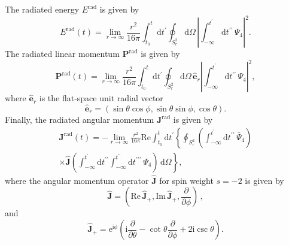 \documentclass[floats,floatfix,showpacs,amssymb,prd,twocolumn,superscriptaddress,nofootinbib,nolongbibliography,reprint]{revtex4-2}
\newcommand{\rad}{\mathrm{rad}}
\newcommand{\rmd}{\mathrm{d}}
\begin{document}
The radiated energy $E^{\rad}$ is given by
\cite{Campanelli:1998jv,Lousto:2007mh}
\begin{equation}
    E^{\rad}(t) = \lim_{r\to\infty}\frac{r^2}{16\pi}\int_{t_0}^t\rmd t^\prime
    \oint_{S^2_r}\rmd\Omega\,\left|\int_{-\infty}^{t^\prime}\rmd t^{\prime\prime}\,
    \Psi_4\right|^2.\label{eq:Erad}
\end{equation}
The radiated linear momentum $\mathbf{P}^{\rad}$ is given by
\begin{equation}
    \mathbf{P}^{\rad}(t) = \lim_{r\to\infty}\frac{r^2}{16\pi}
    \int_{t_0}^t\rmd t^\prime\oint_{S^2_r}\rmd\Omega\,
    \hat{\mathbf{e}}_r\left|\int_{-\infty}^{t^\prime}\rmd t^{\prime\prime}\,
    \Psi_4\right|^2,\label{eq:Prad}
\end{equation}
where $\hat{\mathbf{e}}_r$ is the flat-space unit radial vector
\begin{equation}
    \hat{\mathbf{e}}_r = (\sin\theta\cos\phi,\sin\theta\sin\phi,\cos\theta).
\end{equation}
Finally, the radiated angular momentum $\mathbf{J}^{\rad}$ is given by
\begin{multline}
    \mathbf{J}^{\rad}(t) = - 
    \lim_{r\to\infty}\frac{r^2}{16\pi}\mathrm{Re}\int_{t_0}^{t}\rmd t^\prime
    \left\{\oint_{S^2_r}\left(\int_{-\infty}^{t^\prime}\rmd t^{\prime\prime}\,
    \bar{\Psi}_4\right)\right.\\
    \left. \times\hat{\mathbf{J}}\left(\int_{-\infty}^{t^\prime}
    \rmd t^{\prime\prime}\int_{-\infty}^{t^{\prime\prime}}
    \rmd t^{\prime\prime\prime}\,\Psi_4\right)\,\rmd\Omega\right\},
    \label{eq:Jrad}
\end{multline}
where the angular momentum operator $\hat{\mathbf{J}}$ for spin weight 
$s=-2$ is given by
\begin{equation}
    \hat{\mathbf{J}}=\left(\mathrm{Re}\,\hat{\mathbf{J}}_+,\mathrm{Im}\,
    \hat{\mathbf{J}}_+,\frac{\partial}{\partial\phi}\right)\,,
\end{equation}
and
\begin{equation}
    \hat{\mathbf{J}}_+=\mathrm{e}^{\mathrm{i}\phi}\left(\mathrm{i}
    \frac{\partial}{\partial\theta} - \cot\theta\frac{\partial}{\partial\phi} 
    + 2\mathrm{i}\csc\theta\right).
\end{equation}
\end{document}
